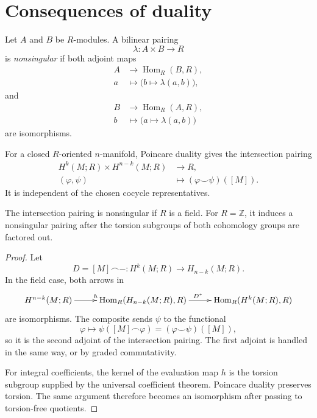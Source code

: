 \section{Consequences of duality}
\label{section-duality-consequences}

\begin{definition}
\label{at-definition-nonsingular-pairing}
Let $A$ and $B$ be $R$-modules.  A
bilinear pairing
$$
\lambda:A\times B\longrightarrow R
$$
is \emph{nonsingular} if both adjoint maps
$$
\begin{aligned}
A&\longrightarrow
\operatorname{Hom}_R(B,R),\\
a&\longmapsto
\bigl(b\longmapsto\lambda(a,b)\bigr),
\end{aligned}
$$
and
$$
\begin{aligned}
B&\longrightarrow
\operatorname{Hom}_R(A,R),\\
b&\longmapsto
\bigl(a\longmapsto\lambda(a,b)\bigr)
\end{aligned}
$$
are isomorphisms.
\end{definition}

\noindent
For a closed $R$-oriented $n$-manifold,
Poincare duality gives the intersection
pairing
$$
\begin{aligned}
H^k(M;R)\times H^{n-k}(M;R)
&\longrightarrow R,\\
(\varphi,\psi)
&\longmapsto
(\varphi\smile\psi)([M]).
\end{aligned}
$$
It is independent of the chosen cocycle
representatives.

\begin{proposition}
\label{at-proposition-duality-pairing}
The intersection pairing is nonsingular if
$R$ is a field.  For $R=\mathbb{Z}$, it
induces a nonsingular pairing after the
torsion subgroups of both cohomology groups
are factored out.
\end{proposition}

\begin{proof}
Let
$$
D=[M]\frown\mathord{-}:
H^k(M;R)\longrightarrow H_{n-k}(M;R).
$$
In the field case, both arrows in
$$
\xymatrix@C=2.6em{
H^{n-k}(M;R)\ar[r]^h
  &\operatorname{Hom}_R
  (H_{n-k}(M;R),R)
  \ar[r]^{D^*}
  &\operatorname{Hom}_R
  (H^k(M;R),R)
}
$$
are isomorphisms.  The composite sends
$\psi$ to the functional
$$
\varphi\longmapsto
\psi([M]\frown\varphi)
=(\varphi\smile\psi)([M]),
$$
so it is the second adjoint of the
intersection pairing.  The first adjoint
is handled in the same way, or by graded
commutativity.

For integral coefficients, the kernel of
the evaluation map $h$ is the torsion
subgroup supplied by the universal
coefficient theorem.  Poincare duality
preserves torsion.  The same argument
therefore becomes an isomorphism after
passing to torsion-free quotients.
\end{proof}

